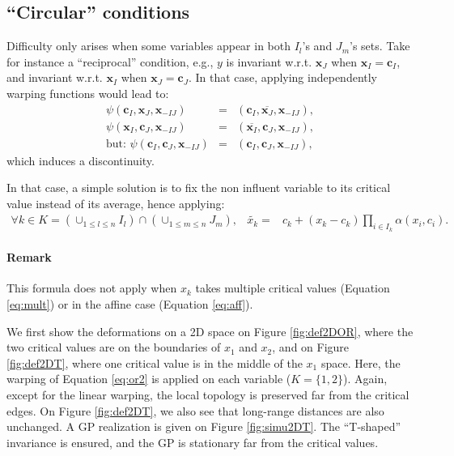 \documentclass[a4paper,10pt]{article}
\newcommand{\x}{\mathbf{x}}
\newcommand{\cc}{\mathbf{c}}
\begin{document}
\subsection{``Circular'' conditions}
Difficulty only arises when some variables appear in both $I_l$'s and $J_m$'s sets. Take for instance a ``reciprocal'' condition, 
e.g., $y$ is invariant w.r.t. $\x_J$ when $\x_I=\cc_I$, and invariant w.r.t. $\x_I$ when $\x_J=\cc_J$.
In that case, applying independently warping functions would lead to: 
\begin{eqnarray*}
 \psi(\cc_I, \x_J, \x_{-IJ}) &=& (\cc_I, \overline{\x_J}, \x_{-IJ}),\\
 \psi(\x_I, \cc_J, \x_{-IJ}) &=& (\overline{\x_I}, \cc_J, \x_{-IJ}),\\
 \text{but: } \psi(\cc_I, \cc_J, \x_{-IJ}) &=& (\cc_I, \cc_J, \x_{-IJ}),
\end{eqnarray*}
which induces a discontinuity.

In that case, a simple solution is to fix the non influent variable to its critical value instead of its average, hence applying:
\begin{eqnarray}
 \forall k \in K= \left( \cup_{1 \leq l \leq n} I_l \right) \cap \left(\cup_{1 \leq m \leq n} J_m \right), &\widetilde{x_k} =& c_k + \left( x_k - c_k\right) \prod_{i \in I_k} \alpha(x_i, c_{i})\label{eq:or2}.
\end{eqnarray}

\paragraph{Remark} This formula does not apply when $x_k$ takes multiple critical values (Equation \ref{eq:mult}) or in the affine case (Equation \ref{eq:aff}).

We first show the deformations on a 2D space on Figure \ref{fig:def2DOR}, where the two critical values are on the boundaries of $x_1$ and $x_2$, and on Figure \ref{fig:def2DT},
where one critical value is in the middle of the $x_1$ space. Here, the warping of Equation \ref{eq:or2} is applied on each variable ($K=\{1,2\}$). 
Again, except for the linear warping, the local topology is preserved far from the critical edges. 
On Figure \ref{fig:def2DT}, we also see that long-range distances are also unchanged.
A GP realization is given on Figure \ref{fig:simu2DT}. The ``T-shaped'' invariance is ensured, and the GP is stationary far from the critical values.
\end{document}
